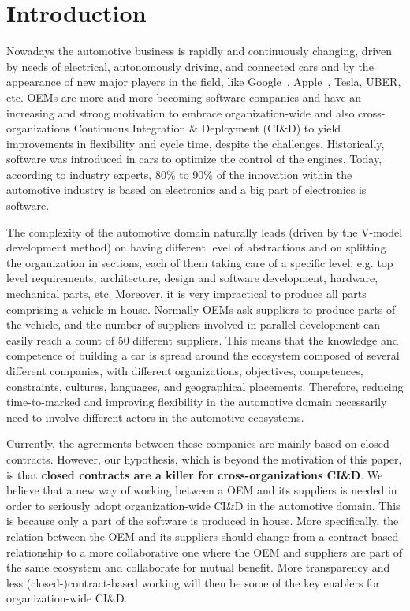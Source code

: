 \section{Introduction}\label{sec:intro}


Nowadays the automotive business is rapidly and continuously changing, driven by needs of 
electrical, autonomously driving, and connected cars and by the appearance of new major players in
the field, like Google~\cite{Google}, Apple~\cite{Apple,Apple2}, Tesla, UBER, etc.
OEMs are more and more becoming software companies 
and have an increasing and strong motivation
to embrace organization-wide and also cross-organizations Continuous Integration \& Deployment (CI\&D) to yield improvements
in flexibility and cycle time, despite the challenges.
Historically, software was introduced in cars
to optimize the control of the engines. 
Today, according to industry experts, 80\%
to 90\% of the innovation within the automotive industry is
based on electronics and a big part of electronics is software. 

The complexity of the automotive domain naturally leads (driven by the V-model development method) on having different level of abstractions and on splitting the organization in sections, each of them taking care of a specific level, e.g. top level requirements,
architecture, design and software development, hardware, mechanical parts, etc. 
Moreover, it is very impractical to produce all parts comprising a vehicle in-house. Normally OEMs 
ask suppliers to produce parts of the vehicle, and the number of suppliers involved in parallel development can easily
reach a count of 50 different suppliers. 
This means that the knowledge and competence of building a car is spread around the ecosystem composed of several different companies, with different organizations, objectives, competences, constraints, cultures, languages, and geographical placements. 
Therefore, reducing time-to-marked and improving flexibility in the automotive domain necessarily need to involve different actors in the automotive ecosystems.

Currently, the agreements between these companies are mainly based on closed contracts. 
However, our hypothesis, which is beyond the motivation of this paper, is that {\bf closed contracts are a killer for cross-organizations CI\&D}.
We believe that a new way of working between a OEM and its
suppliers is needed in order to seriously adopt organization-wide CI\&D in the automotive domain. This is because only a part of the software is produced in house.
More specifically, the relation between the OEM and its suppliers should change from a contract-based relationship to a more
collaborative one where the OEM and suppliers are part
of the same ecosystem and collaborate for mutual benefit.
More transparency and less (closed-)contract-based working will then
be some of the key enablers for organization-wide CI\&D.

